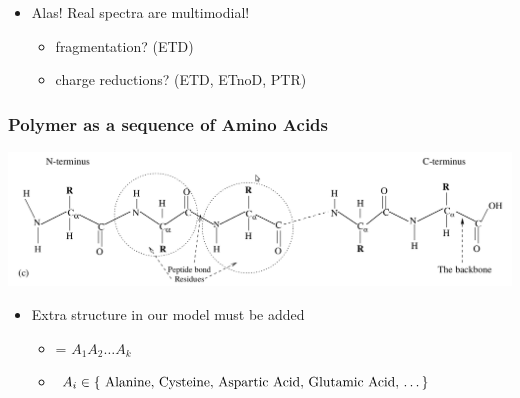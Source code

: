 \documentclass[xetex]{beamer}
\begin{document}
\begin{frame}
		\begin{itemize}
			\item Alas! Real spectra are multimodial!
			\begin{itemize}
				\item fragmentation? (ETD)
				\item charge reductions? (ETD, ETnoD, PTR)
			\end{itemize}
		\end{itemize}
	\end{frame}	


	\begin{frame}\frametitle{Polymer as a sequence of Amino Acids}
		\begin{center}
			\includegraphics[height=.35\textheight, keepaspectratio]{./picts/aminos.png}
		\end{center}		

		\begin{itemize}
			\item Extra structure in our model must be added
			\begin{itemize}
				\item[] \molecule = $A_1 A_2 \dots A_k$
				\item[] $A_i \in \{ \text{
				Alanine, Cysteine, Aspartic Acid, Glutamic Acid, \dots
				} \}$
			\end{itemize}
		\end{itemize}

	\end{frame}

\end{document}
